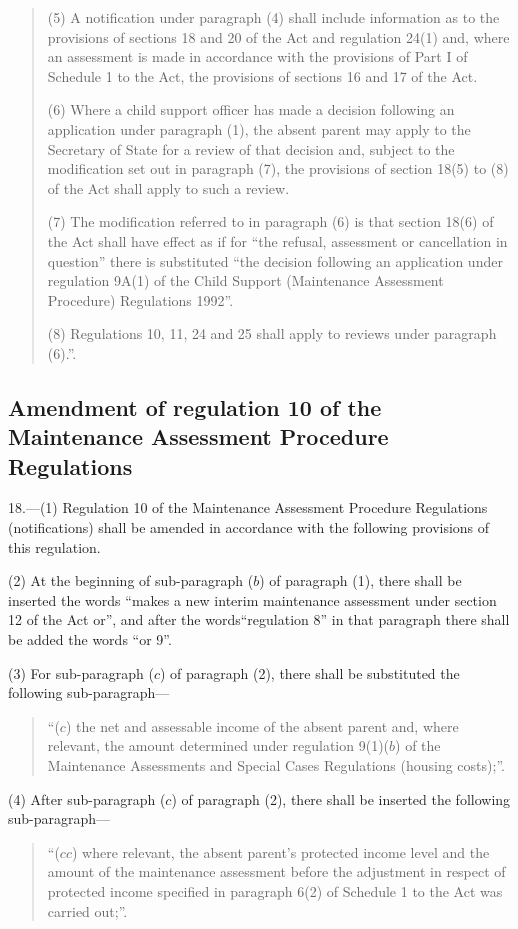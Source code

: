 \documentclass[a4paper]{article}
\begin{document}
\begin{quotation}
(5) A notification under paragraph (4) shall include information as to the provisions of sections 18 and 20 of the Act and regulation 24(1) and, where an assessment is made in accordance with the provisions of Part I of Schedule 1 to the Act, the provisions of sections 16 and 17 of the Act.

(6) Where a child support officer has made a decision following an application under paragraph (1), the absent parent may apply to the Secretary of State for a review of that decision and, subject to the modification set out in paragraph (7), the provisions of section 18(5) to (8) of the Act shall apply to such a review.

(7) The modification referred to in paragraph (6) is that section 18(6) of the Act shall have effect as if for “the refusal, assessment or cancellation in question” there is substituted “the decision following an application under regulation 9A(1) of the Child Support (Maintenance Assessment Procedure) Regulations 1992”.

(8) Regulations 10, 11, 24 and 25 shall apply to reviews under paragraph (6).”.
\end{quotation}

\subsection[18. Amendment of regulation 10 of the Maintenance Assessment Procedure Regulations]{Amendment of regulation 10 of the Maintenance Assessment Procedure Regulations}

18.—(1) Regulation 10 of the Maintenance Assessment Procedure Regulations (notifications) shall be amended in accordance with the following provisions of this regulation.

(2) At the beginning of sub-paragraph ($b$) of paragraph (1), there shall be inserted the words “makes a new interim maintenance assessment under section 12 of the Act or”, and after the words“regulation 8” in that paragraph there shall be added the words “or 9”.

(3) For sub-paragraph ($c$) of paragraph (2), there shall be substituted the following sub-paragraph—
\begin{quotation}
“($c$) the net and assessable income of the absent parent and, where relevant, the amount determined under regulation 9(1)($b$) of the Maintenance Assessments and Special Cases Regulations (housing costs);”.
\end{quotation}

(4) After sub-paragraph ($c$) of paragraph (2), there shall be inserted the following sub-paragraph—
\begin{quotation}
“($cc$) where relevant, the absent parent’s protected income level and the amount of the maintenance assessment before the adjustment in respect of protected income specified in paragraph 6(2) of Schedule 1 to the Act was carried out;”.
\end{quotation}
\end{document}

